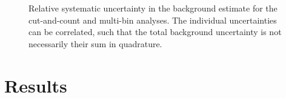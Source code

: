 \begin{figure}[htbp]
	\centering
	\\
	\\
	\caption{Relative systematic uncertainty in the background estimate for the  cut-and-count and  multi-bin analyses. The individual uncertainties can be correlated, such that the total background uncertainty is not necessarily their sum in quadrature.
	} 
	\label{fig:syst}
\end{figure}

\section{Results}


